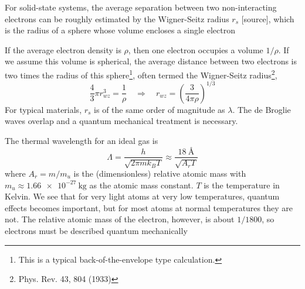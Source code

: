 \documentclass[11pt,bibliography=totoc,index=totoc]{scrbook}   %
\begin{document}
For solid-state systems, the average separation between two non-interacting
electrons can be roughly estimated by the Wigner-Seitz radius $r_s$ [source], 
which is the radius of a sphere whose volume encloses a single electron

If the average electron density is $\rho$, then one electron occupies a volume
$1/\rho$. If we assume this volume is spherical, the average distance between
two electrons is two times the radius of this sphere\footnote{This is a
typical back-of-the-envelope type calculation.}, often termed the 
Wigner-Seitz radius\footnote{Phys. Rev. 43, 804 (1933)},
\begin{equation}
  \frac43\pi r_{wz}^3 = \frac{1}{\rho}\quad
  \Rightarrow \quad r_{wz} = \left(\frac{3}{4\pi\rho}\right)^{1/3}
  \label{eq:wigner-seitz}
\end{equation}
For typical materials, $r_s$ is of the same order of magnitude as $\lambda$. The
de Broglie waves overlap and a quantum mechanical treatment is necessary.

The thermal wavelength for an ideal gas is
\begin{equation}
  \Lambda = \frac{h}{\sqrt{2\pi m k_B T}} \approx \frac{\SI{18}{\angstrom}}{\sqrt{A_r T}}
\end{equation}
where $A_r=m/m_u$ is the (dimensionless) relative atomic mass with
$m_u\approx\SI{1.66e-27}{\kilogram}$ as the atomic mass constant.
$T$ is the temperature in Kelvin.
We see that for very light atoms at very low temperatures, quantum
effects becomes important, but for most atoms at normal temperatures they are not.
The relative atomic mass of the electron, however, is about $1/1800$, so 
electrons must be described quantum mechanically
\end{document}
